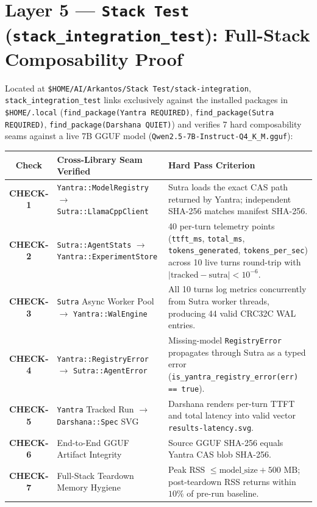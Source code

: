 \documentclass[11pt,a4paper]{article}
\begin{document}
\section{Layer 5 --- \texttt{Stack Test} (\texttt{stack\_integration\_test}): Full-Stack Composability Proof}

Located at \texttt{\$HOME/AI/Arkantos/Stack Test/stack-integration}, \texttt{stack\_integration\_test} links exclusively against the installed packages in \texttt{\$HOME/.local} (\texttt{find\_package(Yantra REQUIRED)}, \texttt{find\_package(Sutra REQUIRED)}, \texttt{find\_package(Darshana QUIET)}) and verifies 7 hard composability seams against a live 7B GGUF model (\texttt{Qwen2.5-7B-Instruct-Q4\_K\_M.gguf}):

\begin{small}
\begin{tabularx}{\textwidth}{clY}
\toprule
\textbf{Check} & \textbf{Cross-Library Seam Verified} & \textbf{Hard Pass Criterion} \\
\midrule
\textbf{CHECK-1} & \texttt{Yantra::ModelRegistry} $\to$ \texttt{Sutra::LlamaCppClient} & Sutra loads the exact CAS path returned by Yantra; independent SHA-256 matches manifest SHA-256. \\
\textbf{CHECK-2} & \texttt{Sutra::AgentStats} $\to$ \texttt{Yantra::ExperimentStore} & 40 per-turn telemetry points (\texttt{ttft\_ms}, \texttt{total\_ms}, \texttt{tokens\_generated}, \texttt{tokens\_per\_sec}) across 10 live turns round-trip with $|\text{tracked} - \text{sutra}| < 10^{-6}$. \\
\textbf{CHECK-3} & \texttt{Sutra} Async Worker Pool $\to$ \texttt{Yantra::WalEngine} & All 10 turns log metrics concurrently from Sutra worker threads, producing 44 valid CRC32C WAL entries. \\
\textbf{CHECK-4} & \texttt{Yantra::RegistryError} $\to$ \texttt{Sutra::AgentError} & Missing-model \texttt{RegistryError} propagates through Sutra as a typed error (\texttt{is\_yantra\_registry\_error(err) == true}). \\
\textbf{CHECK-5} & \texttt{Yantra} Tracked Run $\to$ \texttt{Darshana::Spec} SVG & Darshana renders per-turn TTFT and total latency into valid vector \texttt{results-latency.svg}. \\
\textbf{CHECK-6} & End-to-End GGUF Artifact Integrity & Source GGUF SHA-256 equals Yantra CAS blob SHA-256. \\
\textbf{CHECK-7} & Full-Stack Teardown Memory Hygiene & Peak RSS $\le \text{model\_size} + 500\text{ MB}$; post-teardown RSS returns within $10\%$ of pre-run baseline. \\
\bottomrule
\end{tabularx}
\end{small}
\end{document}
